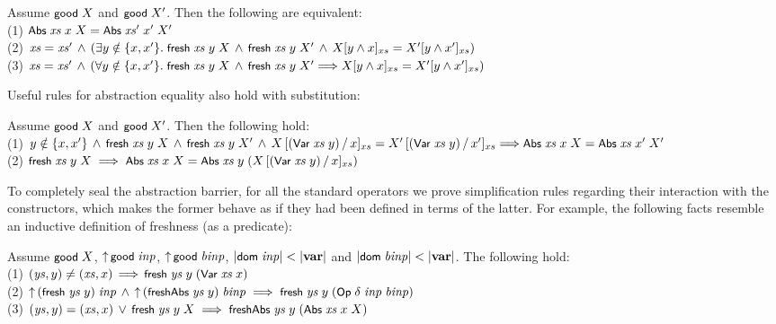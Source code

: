 \documentclass{llncs}
\begin{document}
\begin{prop}\rm \label{lem-Abs}
Assume $\good\;X$ and $\good\;X'$. Then the following are equivalent:
\\(1) $\Abs\;\xs\;x\;X = \Abs\;\xs'\;x'\;X'$ 
\\(2) $\xs = \xs' \,\wedge\,(\exists y \notin \{x,x'\}.\;\fresh\;\xs\;y\;X \,\wedge\,
 \fresh\;\xs\;y\;X' \,\wedge\, X [ y \wedge x]_{xs} = X' [ y \wedge x']_{xs})$
\\(3) $\xs = \xs' \,\wedge\,(\forall y \notin \{x,x'\}.\;\fresh\;\xs\;y\;X \,\wedge\,
 \fresh\;\xs\;y\;X' \Lra X [ y \wedge x]_{xs} = X' [ y \wedge x']_{xs})$
%
\end{prop}

Useful rules for abstraction equality also hold with %
substitution:

\begin{prop}\rm \label{lem-Abs-subst}
Assume $\good\;X$ and $\good\;X'$. Then the following hold: 
\\(1) $y \notin \{x,x'\} \,\wedge\, \fresh\;\xs\;y\;X \,\wedge\,
 \fresh\;\xs\;y\;X' \,\wedge\, X\,[(\Var\;\xs\;y)\,/\,x]_{xs} = X'\,[(\Var\;\xs\;y)\,/\,x']_{xs} \Lra \Abs\;\xs\;x\;X = \Abs\;\xs\;x'\;X'$ 
%
\\(2) $\fresh\;\xs\;y\;X \;\Lra\; \Abs\;\xs\;x\;X = \Abs\;\xs\;y\;(X\,[(\Var\;\xs\;y)\,/\,x]_{xs})$
\end{prop}
 

To completely seal the abstraction barrier, for all the standard operators we prove 
simplification rules regarding their interaction with the constructors, 
which makes the former behave as if they had been defined in terms of the latter. 
For example, the following facts resemble an inductive definition of freshness (as a predicate): 

\begin{prop}\label{lem-imp-fresh}\rm
Assume $\good\;X$, %
$\lift\,\good\;\inp$, $\lift\,\good\;\binp$, 
$|\dom\;\inp| < |\var|$ and $|\dom\;\binp| < |\var|$. 
The following hold:
%
\\(1) $(\ys,y) \not= (\xs,x) \,\Lra\, \fresh\;\ys\;y\;(\Var\;\xs\;x)$
%
\\(2) $\lift\,(\fresh\;\ys\;y)\;\inp \,\wedge\, \lift\,(\freshAbs\;\ys\;y)\;\binp \;\Lra\; 
\fresh\;\ys\;y\;(\Op\;\delta\;\inp\;\binp)$
%
\\(3) $(\ys,y) = (\xs,x)\,\vee\, \fresh\;\ys\;y\;X \;\Lra\; \freshAbs\;\ys\;y\;(\Abs\;\xs\;x\;X)$
\end{prop}
\end{document}
